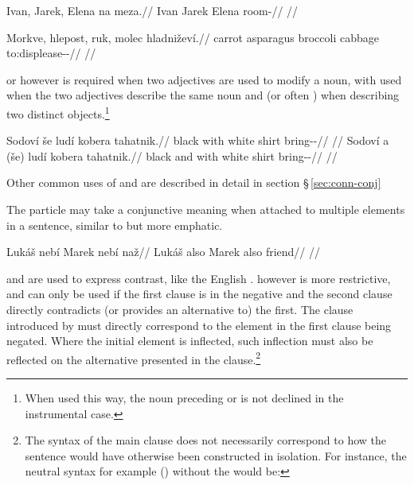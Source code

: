 \pex
\begingl
    \gla Ivan, Jarek, Elena na meza.//
    \glb Ivan Jarek Elena \Loc{} room-\Acc{}//
    \glft {}//
\endgl
\xe

\pex
\begingl
    \gla Morkve, hlepost, ruk, molec hladniževí.//
    \glb carrot asparagus broccoli cabbage to:displease-\Av{}-\Cont{}//
    \glft {}//
\endgl
\xe

 or  however is required when two adjectives are used to modify a
noun, with  used when the two adjectives describe the same noun and
 (or often ) when describing two distinct
objects.\footnote{When used this way, the noun preceding  or 
is not declined in the instrumental case.}

\pex
\a
\begingl
    \gla Sodoví {še} ludí kobera tahatnik.//
    \glb black with white shirt bring-\Pv{}-\Pf{}//
    \glft {}//
\endgl
\a
\begingl
    \gla Sodoví {a} {(še)} ludí kobera tahatnik.//
    \glb black and with white shirt bring-\Pv{}-\Pf{}//
    \glft {}//
\endgl
\xe

Other common uses of  and  are described in detail in section
\S\,\ref{sec:conn-conj}

The particle  may take a conjunctive meaning when attached to
multiple elements in a sentence, similar to  but more emphatic.

\pex
\begingl
    \gla Lukáš nebí Marek nebí naž//
    \glb Lukáš also Marek also friend//
    \glft {}//
\endgl
\xe

 and  are used to express contrast, like the English
.  however is more restrictive, and can only be used if the
first clause is in the negative and the second clause directly contradicts (or
provides an alternative to) the first. The clause introduced by  must
directly correspond to the element in the first clause being negated. Where the
initial element is inflected, such inflection must also be reflected on the
alternative presented in the  clause.\footnote{The syntax of the main
clause does not necessarily correspond to how the sentence would have otherwise
been constructed in isolation. For instance, the neutral syntax for example
() without the  would be: }

